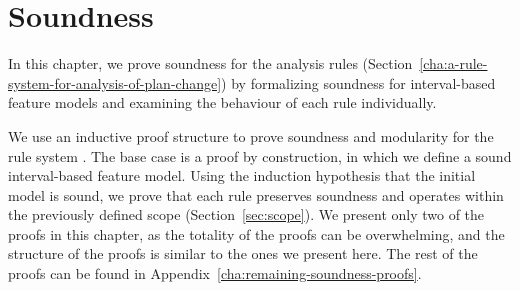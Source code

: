 \chapter{Soundness}
\label{cha:soundness}

In this chapter, we prove soundness for the analysis rules (Section~\vref{cha:a-rule-system-for-analysis-of-plan-change}) by formalizing soundness for interval-based feature models and examining the behaviour of each rule individually.

We use an inductive proof structure to prove soundness and modularity for the rule system . The base case is a proof by construction, in which we define a sound interval-based feature model. Using the induction hypothesis that the initial model is sound, we prove that each rule preserves soundness and operates within the previously defined scope (Section~\vref{sec:scope}). We present only two of the proofs in this chapter, as the totality of the proofs can be overwhelming, and the structure of the proofs is similar to the ones we present here. The rest of the proofs can be found in Appendix~\vref{cha:remaining-soundness-proofs}.








